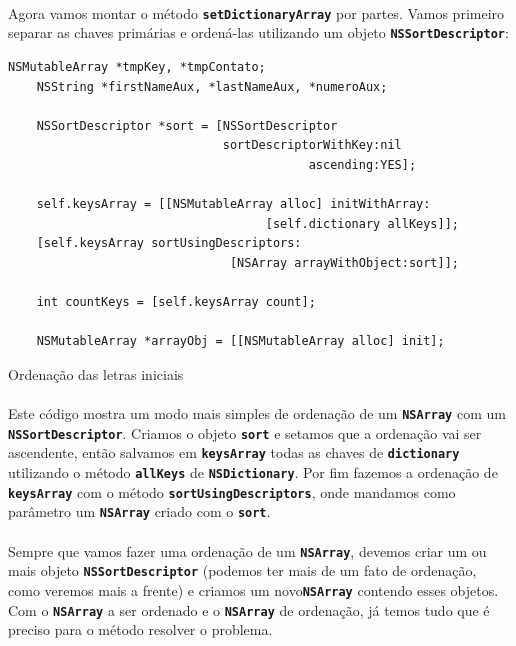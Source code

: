 \documentclass[a4paper,12pt,brazil,doubleside]{book}
\begin{document}
\begin{singlespace}
\paragraph{}Agora vamos montar o método \texttt{\textbf{setDictionaryArray}} por partes. Vamos primeiro separar as chaves primárias e ordená-las utilizando um objeto \texttt{\textbf{NSSortDescriptor}}:

\begin{listing}[H]
\begin{verbatim}
NSMutableArray *tmpKey, *tmpContato;
    NSString *firstNameAux, *lastNameAux, *numeroAux;
    
    NSSortDescriptor *sort = [NSSortDescriptor
                              sortDescriptorWithKey:nil
                                          ascending:YES];
    
    self.keysArray = [[NSMutableArray alloc] initWithArray:
                                    [self.dictionary allKeys]];
    [self.keysArray sortUsingDescriptors:
                               [NSArray arrayWithObject:sort]];
    
    int countKeys = [self.keysArray count];

    NSMutableArray *arrayObj = [[NSMutableArray alloc] init];
\end{verbatim}
\caption{Ordenação das letras iniciais}
\end{listing}

\paragraph{}Este código mostra um modo mais simples de ordenação de um \texttt{\textbf{NSArray}} com um \texttt{\textbf{NSSortDescriptor}}. Criamos o objeto \texttt{\textbf{sort}} e setamos que a ordenação vai ser ascendente, então salvamos em \texttt{\textbf{keysArray}} todas as chaves de \texttt{\textbf{dictionary}} utilizando o método \texttt{\textbf{allKeys}} de \texttt{\textbf{NSDictionary}}. Por fim fazemos a ordenação de \texttt{\textbf{keysArray}} com o método \texttt{\textbf{sortUsingDescriptors}}, onde mandamos como parâmetro um \texttt{\textbf{NSArray}} criado com o \texttt{\textbf{sort}}.
\paragraph{}Sempre que vamos fazer uma ordenação de um \texttt{\textbf{NSArray}}, devemos criar um ou mais objeto \texttt{\textbf{NSSortDescriptor}} (podemos ter mais de um fato de ordenação, como veremos mais a frente) e criamos um novo\texttt{\textbf{NSArray}} contendo esses objetos. Com o \texttt{\textbf{NSArray}} a ser ordenado e o \texttt{\textbf{NSArray}} de ordenação, já temos tudo que é preciso para o método resolver o problema.

\end{singlespace}
\end{document}
